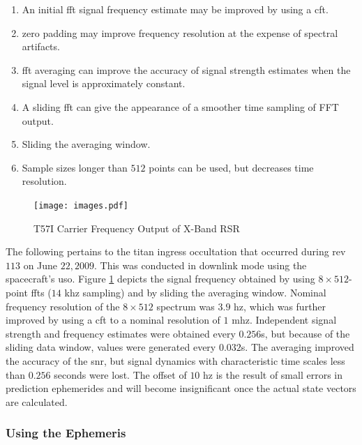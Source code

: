 \documentclass{article}
\theoremstyle{mystyle}
\begin{document}
\begin{enumerate}[itemsep=0pt]
\item An initial \gls{fft} signal frequency estimate may be improved by using a \gls{cft}.
\item \Gls{zero padding} may improve frequency resolution at the expense of spectral artifacts.
\item \gls{fft averaging} can improve the accuracy of signal strength estimates when the signal level is approximately constant.
\item A \gls{sliding fft} can give the appearance of a smoother time sampling of FFT output. 
\item Sliding the averaging window.
\item Sample sizes longer than $512$ points can be used, but decreases time \gls{resolution}. 
\end{enumerate}

\begin{figure}
	\centering
    \vspace{-5ex}
	\texttt{[image: images.pdf]}
	\caption{T57I Carrier Frequency Output of X-Band RSR}
	\label{fig:usr_titan_atmo_occ_T57I_carrier_signal}
\end{figure}

The following pertains to the \gls{titan} \gls{ingress} \gls{occultation} that occurred during \gls{rev} $113$ on June $22, 2009$. This was conducted in  \gls{downlink} mode using the spacecraft's \gls{uso}. Figure \ref{fig:usr_titan_atmo_occ_T57I_carrier_signal} depicts the signal frequency obtained by using $8\times 512$-point \glspl{fft} ($14$ \gls{khz} sampling) and by sliding the averaging window. Nominal \gls{frequency} \gls{resolution} of the $8\times 512$ spectrum was $3.9$ \gls{hz}, which was further improved by using a \gls{cft} to a nominal \gls{resolution} of $1$ \gls{mhz}. Independent signal strength and \gls{frequency} estimates were obtained every $0.256$s, but because of the sliding data window, values were generated every $0.032$s. The averaging improved the accuracy of the \gls{snr}, but signal dynamics with characteristic time scales less than $0.256$ seconds were lost. The offset of $10$ \gls{hz} is the result of small errors in prediction ephemerides and will become insignificant once the actual state vectors are calculated.

\subsubsection{\footnotesize Using the Ephemeris}
\end{document}
